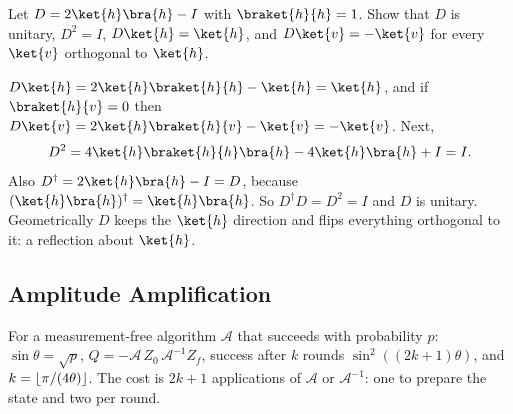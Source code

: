 \begin{exercisebox}
\begin{pproblem}[$D$ is a reflection]\label{wp:dref}
    Let $D = 2\ket{h}\bra{h} - I$ with $\braket{h}{h} = 1$. Show that $D$ is unitary, $D^2 = I$,
    $D\ket{h} = \ket{h}$, and $D\ket{v} = -\ket{v}$ for every $\ket{v}$ orthogonal to $\ket{h}$.
\end{pproblem}
\tcblower
\begin{wsolution}
    $D\ket{h} = 2\ket{h}\braket{h}{h} - \ket{h} = \ket{h}$, and if $\braket{h}{v} = 0$ then
    $D\ket{v} = 2\ket{h}\braket{h}{v} - \ket{v} = -\ket{v}$. Next,
    \[D^2 = 4\ket{h}\braket{h}{h}\bra{h} - 4\ket{h}\bra{h} + I = I.\]
    Also $D^\dagger = 2\ket{h}\bra{h} - I = D$, because $(\ket{h}\bra{h})^\dagger = \ket{h}\bra{h}$.
    So $D^\dagger D = D^2 = I$ and $D$ is unitary. Geometrically $D$ keeps the $\ket{h}$ direction
    and flips everything orthogonal to it: a reflection about $\ket{h}$.
\end{wsolution}
\end{exercisebox}

\subsection{Amplitude Amplification}

For a measurement-free algorithm $\mathcal{A}$ that succeeds with probability $p$:
$\sin\theta = \sqrt{p}$, $Q = -\mathcal{A}\, Z_0\, \mathcal{A}^{-1} Z_f$, success after $k$ rounds
$\sin^2\left((2k+1)\theta\right)$, and $k = \floor{\sfrac{\pi}{(4\theta)}}$. The cost is $2k + 1$
applications of $\mathcal{A}$ or $\mathcal{A}^{-1}$: one to prepare the state and two per round.

